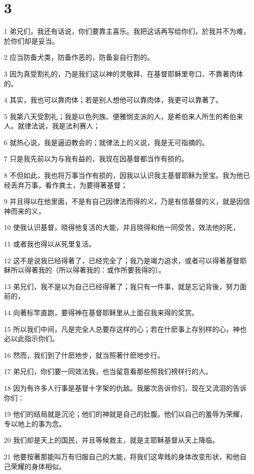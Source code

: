 \chapter{3}

\par 1 弟兄们，我还有话说，你们要靠主喜乐。我把这话再写给你们，於我并不为难，於你们却是妥当。
\par 2 应当防备犬类，防备作恶的，防备妄自行割的。
\par 3 因为真受割礼的，乃是我们这以神的灵敬拜、在基督耶稣里夸口、不靠著肉体的。
\par 4 其实，我也可以靠肉体；若是别人想他可以靠肉体，我更可以靠著了。
\par 5 我第八天受割礼；我是以色列族、便雅悯支派的人，是希伯来人所生的希伯来人。就律法说，我是法利赛人；
\par 6 就热心说，我是逼迫教会的；就律法上的义说，我是无可指摘的。
\par 7 只是我先前以为与我有益的，我现在因基督都当作有损的。
\par 8 不但如此，我也将万事当作有损的，因我以认识我主基督耶稣为至宝。我为他已经丢弃万事，看作粪土，为要得著基督；
\par 9 并且得以在他里面，不是有自己因律法而得的义，乃是有信基督的义，就是因信神而来的义，
\par 10 使我认识基督，晓得他复活的大能，并且晓得和他一同受苦，效法他的死，
\par 11 或者我也得以从死里复活。
\par 12 这不是说我已经得著了，已经完全了；我乃是竭力追求，或者可以得著基督耶稣所以得著我的（所以得著我的：或作所要我得的）。
\par 13 弟兄们，我不是以为自己已经得著了；我只有一件事，就是忘记背後，努力面前的，
\par 14 向著标竿直跑，要得神在基督耶稣里从上面召我来得的奖赏。
\par 15 所以我们中间，凡是完全人总要存这样的心；若在什麽事上存别样的心，神也必以此指示你们。
\par 16 然而，我们到了什麽地步，就当照著什麽地步行。
\par 17 弟兄们，你们要一同效法我，也当留意看那些照我们榜样行的人。
\par 18 因为有许多人行事是基督十字架的仇敌。我屡次告诉你们，现在又流泪的告诉你们：
\par 19 他们的结局就是沉沦；他们的神就是自己的肚腹。他们以自己的羞辱为荣耀，专以地上的事为念。
\par 20 我们却是天上的国民，并且等候救主，就是主耶稣基督从天上降临。
\par 21 他要按著那能叫万有归服自己的大能，将我们这卑贱的身体改变形状，和他自己荣耀的身体相似。

